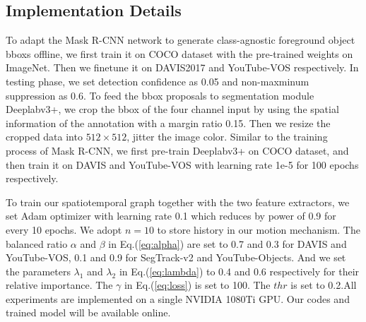 \documentclass[letterpaper]{article} %
\begin{document}
\subsection{Implementation Details}
To adapt the Mask R-CNN network to generate class-agnostic foreground object bboxs offline, we first train it on COCO dataset with the pre-trained weights on ImageNet. Then we finetune it on DAVIS2017 and YouTube-VOS respectively. In testing phase, we set detection confidence as 0.05 and non-maxminum suppression as 0.6.
To feed the bbox proposals to segmentation module Deeplabv3+, we crop the bbox of the four channel input by using the spatial information of the annotation with a margin ratio 0.15. Then we resize the cropped data into $512 \times 512$, jitter the image color. Similar to the training process of Mask R-CNN, we first pre-train Deeplabv3+ on COCO dataset, and then train it on DAVIS and YouTube-VOS with learning rate 1e-5 for 100 epochs respectively.

To train our spatiotemporal graph together with the two feature extractors, we set Adam optimizer with learning rate 0.1 which reduces by power of 0.9 for every 10 epochs. We adopt $n=10$ to store history in our motion mechanism. The balanced ratio $\alpha$ and $\beta$ in Eq.(\ref{eq:alpha}) are set to 0.7 and 0.3 for DAVIS and YouTube-VOS, 0.1 and 0.9 for SegTrack-v2 and YouTube-Objects. And we set the parameters $\lambda_1$ and $\lambda_2$ in Eq.(\ref{eq:lambda}) to 0.4 and 0.6 respectively for their relative importance. The $\gamma$ in Eq.(\ref{eq:loss}) is set to 100. The $thr$ is set to 0.2.All experiments are implemented on a single NVIDIA 1080Ti GPU. Our codes and trained model will be available online.
\end{document}
